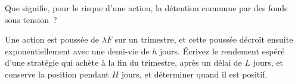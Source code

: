 \begin{interviewq}\label{iq:s1:flows:5}
Que signifie, pour le risque d'une action, la détention commune par des fonds sous tension~?
\end{interviewq}

\begin{interviewq}\label{iq:s1:flows:6}
Une action est poussée de $\lambda F$ sur un trimestre, et cette poussée décroît ensuite exponentiellement avec une demi-vie de $h$ jours. Écrivez le rendement espéré d'une stratégie
qui achète à la fin du trimestre, après un délai de $L$ jours, et conserve la position pendant $H$ jours, et déterminer quand il est positif.
\end{interviewq}
